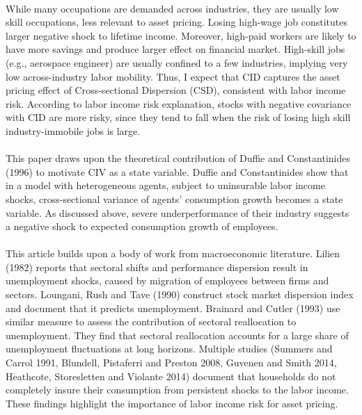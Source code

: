 \documentclass[12pt]{article}
\begin{document}
\paragraph{}
While many occupations are demanded across industries, they are usually low skill occupations, less relevant to asset pricing. Losing high-wage job constitutes larger negative shock to lifetime income. Moreover, high-paid workers are likely to have more savings and produce larger effect on financial market. High-skill jobs (e.g., aerospace engineer) are usually confined to a few industries, implying very low across-industry labor mobility. Thus, I expect that CID captures the asset pricing effect of Cross-sectional Dispersion (CSD), consistent with labor income risk. According to labor income risk explanation, stocks with negative covariance with CID are more risky, since they tend to fall when the risk of losing high skill industry-immobile jobs is large.
\paragraph{}
This paper draws upon the theoretical contribution of Duffie and Constantinides (1996) to motivate CIV as a state variable. Duffie and Constantinides show that in a model with heterogeneous agents, subject to uninsurable labor income shocks, cross-sectional variance of agents' consumption growth becomes a state variable. As discussed above, severe underperformance of their industry suggests a negative shock to expected consumption growth of employees.
\paragraph{}
This article builds upon a body of work from macroeconomic literature. Lilien (1982) reports that sectoral shifts and performance dispersion result in unemployment shocks, caused by migration of employees between firms and sectors. Loungani, Rush and Tave (1990) construct stock market dispersion index and document that it predicts unemployment. Brainard and Cutler (1993) use similar measure to assess the contribution of sectoral reallocation to unemployment. They find that sectoral reallocation accounts for a large share of unemployment fluctuations at long horizons. Multiple studies (Summers and Carrol 1991, Blundell, Pistaferri and Preston 2008, Guvenen and Smith 2014, Heathcote, Storesletten and Violante 2014) document that households do not completely insure their consumption from persistent shocks to the labor income. These findings highlight the importance of labor income risk for asset pricing.
\end{document}
